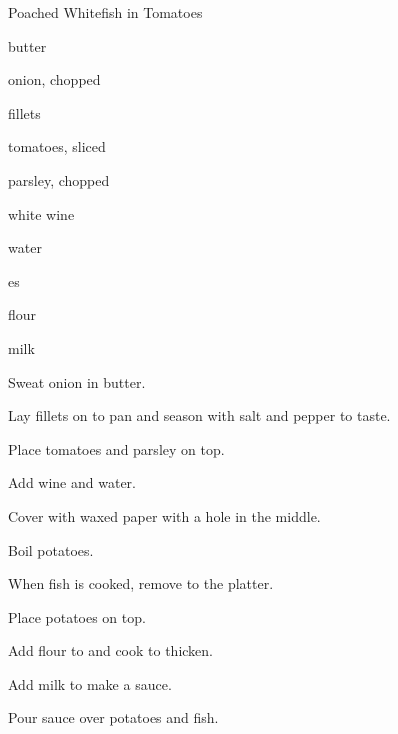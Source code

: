 \begin{recipe}{Poached Whitefish in Tomatoes}{}{}

\begin{ingredients}
\item {} butter
\item onion, chopped
\item {} fillets
\item tomatoes, sliced
\item parsley, chopped
\item \C{\half} white wine
\item \C{\half} water
\item {}es
\item {} flour
\item \C{\half} milk
\end{ingredients}

\begin{directions}
\item Sweat onion in butter.
\item Lay fillets on to pan and season with salt and pepper to taste.
\item Place tomatoes and parsley on top.
\item Add wine and water.
\item Cover with waxed paper with a hole in the middle.
\item Boil potatoes.
\item When fish is cooked, remove to the platter.
\item Place potatoes on top.
\item Add flour to and cook to thicken.
\item Add milk to make a sauce.
\item Pour sauce over potatoes and fish.
\end{directions}

\end{recipe}
